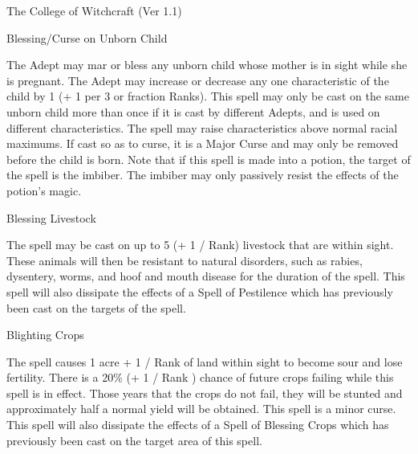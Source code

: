 \begin{Chapter}{The College of Witchcraft (Ver 1.1)}
\begin{spell}[S-2]{Blessing/Curse on Unborn Child}
\begin{effects}
The Adept may mar or bless any unborn child whose mother is in sight
while she is pregnant. The Adept may increase or decrease any one
characteristic of the child by 1 (+ 1 per 3 or fraction Ranks).  This
spell may only be cast on the same unborn child more than once if it
is cast by different Adepts, and is used on different characteristics.
The spell may raise characteristics above normal racial maximums. If
cast so as to curse, it is a Major Curse and may only be removed
before the child is born. Note that if this spell is made into a
potion, the target of the spell is the imbiber.  The imbiber may only
passively resist the effects of the potion’s magic.
\end{effects}
\end{spell}

\begin{spell}[S-3]{Blessing Livestock}

\begin{effects}
The spell may be cast on up to 5 (+ 1 / Rank) livestock that are
within sight.  These animals will then be resistant to natural
disorders, such as rabies, dysentery, worms, and hoof and mouth
disease for the duration of the spell.  This spell will also dissipate
the effects of a Spell of Pestilence which has previously been cast on
the targets of the spell.
\end{effects}
\end{spell}

\begin{spell}[S-4]{Blighting Crops}

\begin{effects}
The spell causes 1 acre + 1 / Rank of land within sight to become sour
and lose fertility.  There is a 20\% (+ 1 / Rank ) chance of future
crops failing while this spell is in effect. Those years that the
crops do not fail, they will be stunted and approximately half a
normal yield will be obtained.  This spell is a minor curse.  This
spell will also dissipate the effects of a Spell of Blessing Crops
which has previously been cast on the target area of this spell.
\end{effects}
\end{spell}


\end{Chapter}

